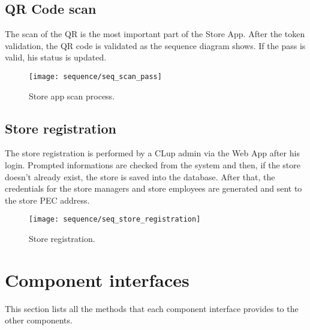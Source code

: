 \subsection{QR Code scan}
The scan of the QR is the most important part of the Store App. After the token validation, the QR code is validated as the sequence diagram shows. If the pass is valid, his status is updated.
\begin{figure}[H]
	\centering
	\texttt{[image: sequence/seq\_scan\_pass]}
	\caption{Store app scan process.}
	\label{fig:seq_scan_pass}
\end{figure}

\subsection{Store registration}
The store registration is performed by a CLup admin via the Web App after his login. Prompted informations are checked from the system and then, if the store doesn't already exist, the store is saved into the database. After that, the credentials for the store managers and store employees are generated and sent to the store PEC address.
\begin{figure}[H]
	\centering
	\texttt{[image: sequence/seq\_store\_registration]}
	\caption{Store registration.}
	\label{fig:seq_store_registration}
\end{figure}

\clearpage

\section{Component interfaces}
This section lists all the methods that each component interface provides to the other components.

